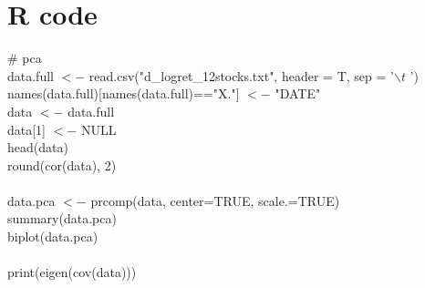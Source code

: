 \documentclass[conference]{IEEEtran}
\begin{document}
\newpage
\appendices

\setcounter{figure}{0}
\setcounter{table}{0}  

\onecolumn
\section{R code}
\# pca\\
data.full $<-$ read.csv("d\_logret\_12stocks.txt", header = T, sep = '$\backslash t$ ') \\
names(data.full)[names(data.full)=="X."] $<-$ "DATE" \\
data $<-$ data.full\\
data[1] $<-$ NULL\\
head(data)\\
round(cor(data), 2)\\
\\
data.pca $<-$ prcomp(data, center=TRUE, scale.=TRUE)\\
summary(data.pca)\\
biplot(data.pca)\\
\\
print(eigen(cov(data)))\\


\end{document}
